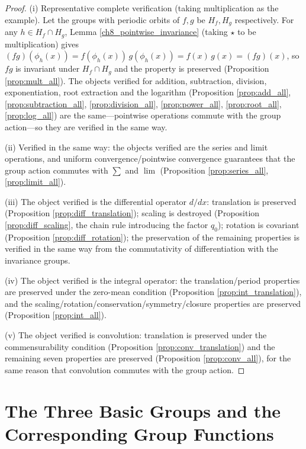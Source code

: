 \begin{proof}
(i) Representative complete verification (taking multiplication as the example). Let the groups with periodic orbits of $f,g$ be $H_f,H_g$ respectively. For any $h\in H_f\cap H_g$, Lemma \ref{ch8_pointwise_invariance} (taking $\star$ to be multiplication) gives $(fg)(\phi_h(x))=f(\phi_h(x))\,g(\phi_h(x))=f(x)\,g(x)=(fg)(x)$, so $fg$ is invariant under $H_f\cap H_g$ and the property is preserved (Proposition \ref{prop:mult_all}). The objects verified for addition, subtraction, division, exponentiation, root extraction and the logarithm (Proposition \ref{prop:add_all}, \ref{prop:subtraction_all}, \ref{prop:division_all}, \ref{prop:power_all}, \ref{prop:root_all}, \ref{prop:log_all}) are the same---pointwise operations commute with the group action---so they are verified in the same way.

(ii) Verified in the same way: the objects verified are the series and limit operations, and uniform convergence/pointwise convergence guarantees that the group action commutes with $\sum$ and $\lim$ (Proposition \ref{prop:series_all}, \ref{prop:limit_all}).

(iii) The object verified is the differential operator $d/dx$: translation is preserved (Proposition \ref{prop:diff_translation}); scaling is destroyed (Proposition \ref{prop:diff_scaling}, the chain rule introducing the factor $q_0$); rotation is covariant (Proposition \ref{prop:diff_rotation}); the preservation of the remaining properties is verified in the same way from the commutativity of differentiation with the invariance groups.

(iv) The object verified is the integral operator: the translation/period properties are preserved under the zero-mean condition (Proposition \ref{prop:int_translation}), and the scaling/rotation/conservation/symmetry/closure properties are preserved (Proposition \ref{prop:int_all}).

(v) The object verified is convolution: translation is preserved under the commensurability condition (Proposition \ref{prop:conv_translation}) and the remaining seven properties are preserved (Proposition \ref{prop:conv_all}), for the same reason that convolution commutes with the group action.
\end{proof}

\section{\texorpdfstring{The Three Basic Groups and the Corresponding Group Functions}{The Three Basic Groups and the Corresponding Group Functions}}

